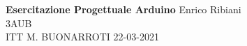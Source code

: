 \documentclass{article}
\begin{document}
    \begin{titlepage}
\begin{flushleft}
\vspace{3\baselineskip}

\huge{\textbf{Esercitazione Progettuale Arduino}}
\vfill
\LARGE Enrico Ribiani\\
\LARGE 3AUB\\
\vfill
\huge{ITT M. BUONARROTI 22-03-2021}

\end{flushleft}
\end{titlepage}
\end{document}
